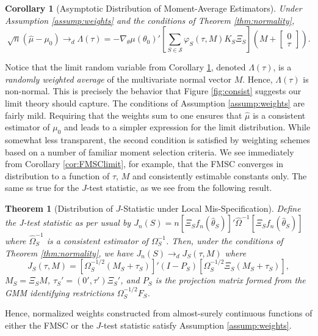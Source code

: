 \documentclass[12pt]{article}
\newtheorem{thm}{Theorem}[section]
\newtheorem{cor}{Corollary}[section]
\theoremstyle{definition}
\begin{document}
\begin{cor}[Asymptotic Distribution of Moment-Average Estimators]
\label{cor:momentavg}
Under Assumption \ref{assump:weights} and the conditions of Theorem \ref{thm:normality},
	$$\sqrt{n}\left(\widehat{\mu} -  \mu_0\right) \rightarrow_{d}\Lambda(\tau) =  -\nabla_\theta\mu(\theta_0)'\left[\sum_{S \in \mathscr{S}} \varphi_S(\tau,M) K_S\Xi_S\right] \left(M + \left[\begin{array}
	{c} 0 \\ \tau
\end{array} \right]\right).$$
\end{cor}
Notice that the limit random variable from Corollary \ref{cor:momentavg}, denoted $\Lambda(\tau)$, is a \emph{randomly weighted average} of the multivariate normal vector $M$. 
Hence, $\Lambda(\tau)$ is non-normal. 
This is precisely the behavior that Figure \ref{fig:consist} suggests our limit theory should capture.
The conditions of Assumption \ref{assump:weights} are fairly mild. 
Requiring that the weights sum to one ensures that $\widehat{\mu}$ is a consistent estimator of $\mu_0$ and leads to a simpler expression for the limit distribution. 
While somewhat less transparent, the second condition is satisfied by weighting schemes based on a number of familiar moment selection criteria.
We see immediately from Corollary \ref{cor:FMSClimit}, for example, that the FMSC converges in distribution to a function of $\tau$, $M$ and consistently estimable constants only. 
The same ss true for the $J$-test statistic, as we see from the following result. 
\begin{thm}[Distribution of $J$-Statistic under Local Mis-Specification] 
\label{pro:jstat}
	Define the J-test statistic as per usual by $J_n(S)  = n \left[\Xi_S f_n(\widehat{\theta}_S)\right]' \widehat{\Omega}^{-1}\left[\Xi_S f_n(\widehat{\theta}_S)\right]$ where $\widehat{\Omega}^{-1}_S$ is a consistent estimator of $\Omega_S^{-1}$. Then, under the conditions of Theorem \ref{thm:normality}, we have $J_n(S) \rightarrow_dJ_S(\tau, M)$ where
		$$J_S(\tau, M)=[\Omega_S^{-1/2}(M_S + \tau_S)]' (I - P_S)[\Omega_S^{-1/2}\Xi_S(M_S + \tau_S)],$$
$M_S = \Xi_S M$, $\tau_S' = (0', \tau')\Xi_S'$, and $P_S$ is the projection matrix formed from the GMM identifying restrictions $\Omega^{-1/2}_S F_S$.
\end{thm}
Hence, normalized weights constructed from almost-surely continuous functions of either the FMSC or the $J$-test statistic satisfy Assumption \ref{assump:weights}. 
\end{document}
